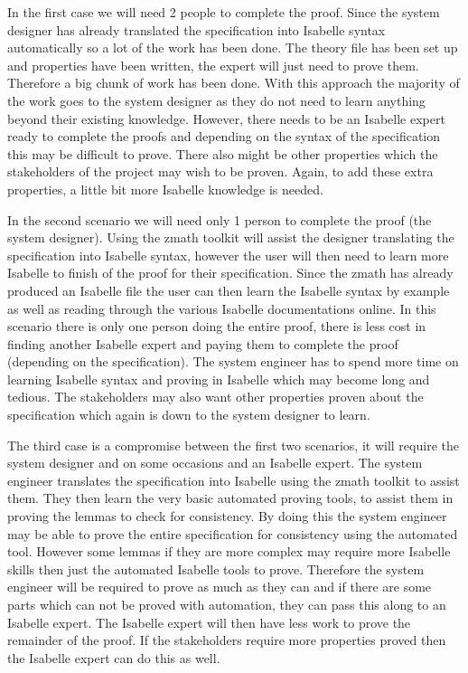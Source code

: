 In the first case we will need 2 people to complete the proof. Since the system
designer has already translated the specification into Isabelle syntax
automatically so a lot of the work has been done. The theory file has been set
up and properties have been written, the expert will just need to prove them.
Therefore a big chunk of work has been done. With this approach the majority of
the work goes 
to the system designer as they do not need to learn anything beyond their
existing knowledge. However, there
needs to be an Isabelle expert ready to complete the proofs and depending on the
syntax of the specification this may be difficult to prove. There also might be
other properties which the stakeholders of the project may wish to be proven.
Again, to add these extra properties, a little bit more Isabelle knowledge is
needed.

In the second scenario we will need only 1 person to complete the proof (the
system designer). Using the \gls{zmath} toolkit will assist the designer
translating the specification into Isabelle syntax, however the user will then
need to learn more Isabelle to finish of the proof for their specification.
Since the \gls{zmath} has already produced an Isabelle file the user can then
learn the Isabelle syntax by example as well as reading through the various
Isabelle documentations online. In this scenario 
there is only one person doing the entire proof, there is less cost in finding
another Isabelle expert and paying them to complete the proof (depending on
the specification). The system engineer has to spend more time on learning
Isabelle syntax and proving in Isabelle which may become long and tedious. The
stakeholders may also want other properties proven about the specification which
again is down to the system designer to learn.

The third case is a compromise between the first two scenarios, it will require
the system designer and on some occasions and an Isabelle expert. The system
engineer translates the specification into Isabelle using the \gls{zmath}
toolkit to assist them. They then learn the very basic automated proving tools,
to assist them in proving the lemmas to check for consistency. By doing this the
system engineer may be able to prove the entire specification for consistency
using the automated tool. However some lemmas if they are more complex may
require more Isabelle skills then just the automated Isabelle tools to prove.
Therefore the system engineer will be required to prove as much as they can and
if there are some parts which can not be proved with automation, they can pass
this along to an Isabelle expert. The Isabelle expert will then have less work
to prove the remainder of the proof. If the stakeholders require more properties
proved then the Isabelle expert can do this as well.

